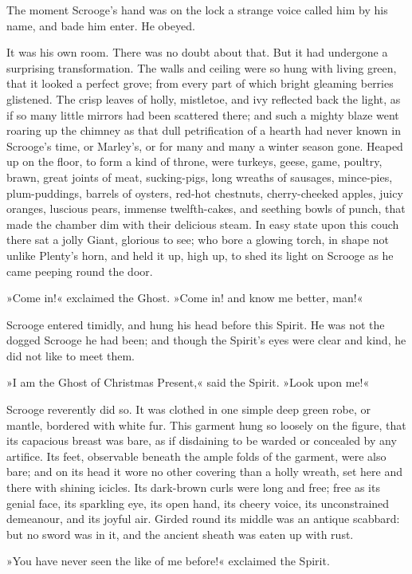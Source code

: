 The moment Scrooge's hand was on the lock a strange voice called him by his name, and bade him enter. He obeyed.

It was his own room. There was no doubt about that. But it had undergone a surprising transformation. The walls and ceiling were so hung with living green, that it looked a perfect grove; from every part of which bright gleaming berries glistened. The crisp leaves of holly, mistletoe, and ivy reflected back the light, as if so many little mirrors had been scattered there; and such a mighty blaze went roaring up the chimney as that dull petrification of a hearth had never known in Scrooge's time, or Marley's, or for many and many a winter season gone. Heaped up on the floor, to form a kind of throne, were turkeys, geese, game, poultry, brawn, great joints of meat, sucking-pigs, long wreaths of sausages, mince-pies, plum-puddings, barrels of oysters, red-hot chestnuts, cherry-cheeked apples, juicy oranges, luscious pears, immense twelfth-cakes, and seething bowls of punch, that made the chamber dim with their delicious steam. In easy state upon this couch there sat a jolly Giant, glorious to see; who bore a glowing torch, in shape not unlike Plenty's horn, and held it up, high up, to shed its light on Scrooge as he came peeping round the door.

»Come in!« exclaimed the Ghost. »Come in! and know me better, man!«

Scrooge entered timidly, and hung his head before this Spirit. He was not the dogged Scrooge he had been; and though the Spirit's eyes were clear and kind, he did not like to meet them.

»I am the Ghost of Christmas Present,« said the Spirit. »Look upon me!«

Scrooge reverently did so. It was clothed in one simple deep green robe, or mantle, bordered with white fur. This garment hung so loosely on the figure, that its capacious breast was bare, as if disdaining to be warded or concealed by any artifice. Its feet, observable beneath the ample folds of the garment, were also bare; and on its head it wore no other covering than a holly wreath, set here and there with shining icicles. Its dark-brown curls were long and free; free as its genial face, its sparkling eye, its open hand, its cheery voice, its unconstrained demeanour, and its joyful air. Girded round its middle was an antique scabbard: but no sword was in it, and the ancient sheath was eaten up with rust.

»You have never seen the like of me before!« exclaimed the Spirit.

